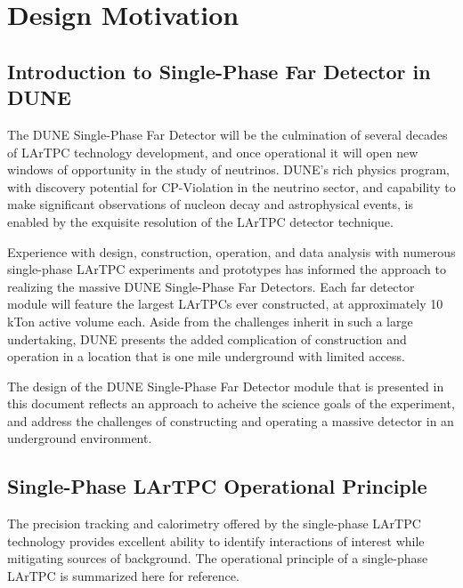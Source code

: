 \chapter{Design Motivation}
\label{ch:fdsp-apa-design}

\section{Introduction to Single-Phase Far Detector in DUNE}
\label{sec:fdsp-design-intro}

The DUNE Single-Phase Far Detector will be the culmination of several decades
of LArTPC technology development, and once operational it will open new windows of opportunity in the study
of neutrinos.  DUNE's rich physics program, with discovery
potential for CP-Violation in the neutrino sector, and capability to make
significant observations of nucleon decay and astrophysical events, is enabled
by the exquisite resolution of the LArTPC detector technique.

Experience with design, construction, operation, and data
analysis with numerous single-phase LArTPC experiments and prototypes has informed the approach to
realizing the massive DUNE Single-Phase Far Detectors. Each far detector module will feature the largest LArTPCs ever
constructed, at approximately 10 kTon active volume each.  Aside from the
challenges inherit in such a large undertaking, DUNE presents the added complication of construction and operation in a location
that is one mile underground with limited access.

The design of the DUNE Single-Phase Far Detector module that is presented in this document
reflects an approach to acheive the science goals of the experiment, and
address the challenges of constructing and operating a massive detector in an
underground environment.


\section{Single-Phase LArTPC Operational Principle}
\label{sec:fdsp-design-op}

The precision tracking and calorimetry offered by the single-phase LArTPC
technology provides excellent ability to identify interactions of interest
while mitigating sources of background.  The operational principle of a
single-phase LArTPC is summarized here for reference.

